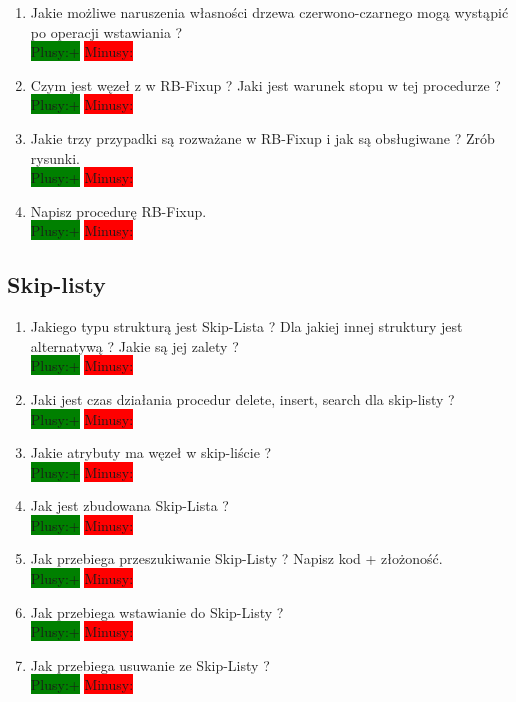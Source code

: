 \documentclass[a4paper,11pt]{article}
\begin{document}
\begin{enumerate}
\item Jakie możliwe naruszenia własności drzewa czerwono-czarnego mogą wystąpić po operacji wstawiania ?
\\ \colorbox{green}{Plusy:+} \colorbox{red}{Minusy: } 

\item Czym jest węzeł z w RB-Fixup ? Jaki jest warunek stopu w tej procedurze ? 
\\ \colorbox{green}{Plusy:+} \colorbox{red}{Minusy: } 

\item Jakie trzy przypadki są rozważane w RB-Fixup i jak są obsługiwane ? Zrób rysunki. 
\\ \colorbox{green}{Plusy:+} \colorbox{red}{Minusy: } 

\item Napisz procedurę RB-Fixup. 
\\ \colorbox{green}{Plusy:+} \colorbox{red}{Minusy: }  
\end{enumerate}


\subsection{Skip-listy}
\begin{enumerate}
\item Jakiego typu strukturą jest Skip-Lista ? Dla jakiej innej struktury jest alternatywą ? Jakie są jej zalety ?
\\ \colorbox{green}{Plusy:+} \colorbox{red}{Minusy: }  

\item Jaki jest czas działania procedur delete, insert, search dla skip-listy ?
\\ \colorbox{green}{Plusy:+} \colorbox{red}{Minusy: }  

\item Jakie atrybuty ma węzeł w skip-liście ?
\\ \colorbox{green}{Plusy:+} \colorbox{red}{Minusy: }  

\item Jak jest zbudowana Skip-Lista ?
\\ \colorbox{green}{Plusy:+} \colorbox{red}{Minusy: }  

\item Jak przebiega przeszukiwanie Skip-Listy ? Napisz kod + złożoność.
\\ \colorbox{green}{Plusy:+} \colorbox{red}{Minusy: }  

\item Jak przebiega wstawianie do Skip-Listy ?
\\ \colorbox{green}{Plusy:+} \colorbox{red}{Minusy: } 

\item Jak przebiega usuwanie ze Skip-Listy ?
\\ \colorbox{green}{Plusy:+} \colorbox{red}{Minusy: } 

\end{enumerate}
\end{document}
